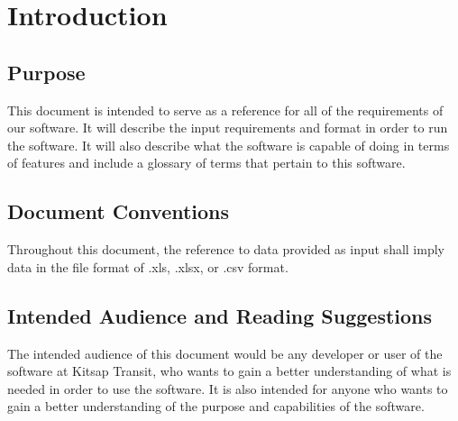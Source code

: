 \section{Introduction}

\subsection{Purpose}

This document is intended to serve as a reference for all of the requirements of our software. It will describe the input requirements and format in order to run the software. It will also describe what the software is capable of doing in terms of features and include a glossary of terms that pertain to this software.

\subsection{Document Conventions}

Throughout this document, the reference to data provided as input shall imply data in the file format of .xls, .xlsx, or .csv format.

\subsection{Intended Audience and Reading Suggestions}

The intended audience of this document would be any developer or user of the software at Kitsap Transit, who wants to gain a better understanding of what is needed in order to use the software. It is also intended for anyone who wants to gain a better understanding of the purpose and capabilities of the software.

